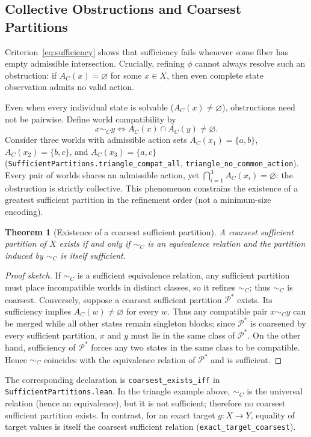 \documentclass[10pt,letterpaper]{article}
\newtheorem{theorem}{Theorem}[section]
\begin{document}
\subsection{Collective Obstructions and Coarsest Partitions}
Criterion~\eqref{eq:sufficiency} shows that sufficiency fails whenever some fiber has empty admissible intersection. Crucially, refining $\phi$ cannot always resolve such an obstruction: if $A_C(x) = \varnothing$ for some $x \in X$, then even complete state observation admits no valid action.

Even when every individual state is solvable ($A_C(x) \neq \varnothing$), obstructions need not be pairwise. Define world compatibility by
\[
x \sim_C y \iff A_C(x) \cap A_C(y) \neq \varnothing.
\]
Consider three worlds with admissible action sets $A_C(x_1)=\{a,b\}$, $A_C(x_2)=\{b,c\}$, and $A_C(x_3)=\{a,c\}$ (\texttt{SufficientPartitions.triangle\_compat\_all}, \texttt{triangle\_no\_common\_action}). Every pair of worlds shares an admissible action, yet $\bigcap_{i=1}^3 A_C(x_i) = \varnothing$: the obstruction is strictly collective. This phenomenon constrains the existence of a greatest sufficient partition in the refinement order (not a minimum-size encoding).

\begin{theorem}[Existence of a coarsest sufficient partition]
\label{thm:coarsest}
A coarsest sufficient partition of $X$ exists if and only if $\sim_C$ is an equivalence relation and the partition induced by $\sim_C$ is itself sufficient.
\end{theorem}

\begin{proof}[Proof sketch]
If $\sim_C$ is a sufficient equivalence relation, any sufficient partition must place incompatible worlds in distinct classes, so it refines $\sim_C$; thus $\sim_C$ is coarsest. Conversely, suppose a coarsest sufficient partition $\mathcal{P}^*$ exists. Its sufficiency implies $A_C(w)\ne\varnothing$ for every $w$. Thus any compatible pair $x\sim_C y$ can be merged while all other states remain singleton blocks; since $\mathcal{P}^*$ is coarsened by every sufficient partition, $x$ and $y$ must lie in the same class of $\mathcal{P}^*$. On the other hand, sufficiency of $\mathcal{P}^*$ forces any two states in the same class to be compatible. Hence $\sim_C$ coincides with the equivalence relation of $\mathcal{P}^*$ and is sufficient.
\end{proof}

The corresponding declaration is \texttt{coarsest\_exists\_iff} in \texttt{SufficientPartitions.lean}. In the triangle example above, $\sim_C$ is the universal relation (hence an equivalence), but it is not sufficient; therefore no coarsest sufficient partition exists. In contrast, for an exact target $g:X\to Y$, equality of target values is itself the coarsest sufficient relation (\texttt{exact\_target\_coarsest}).
\end{document}
